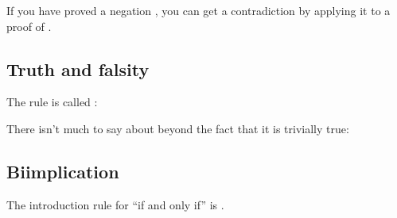 \documentclass[letterpaper,10pt,english]{sphinxmanual}
\begin{document}
\sphinxAtStartPar
If you have proved a negation , you can get a contradiction by applying it to a proof of .

\begin{sphinxVerbatim}[commandchars=\\\{\}]
       

     
\end{sphinxVerbatim}


\subsection{Truth and falsity}
\label{\detokenize{propositional_logic_in_lean:truth-and-falsity}}
\sphinxAtStartPar
The  rule is called :

\begin{sphinxVerbatim}[commandchars=\\\{\}]
   

     
\end{sphinxVerbatim}

\sphinxAtStartPar
There isn’t much to say about  beyond the fact that it is trivially true:

\begin{sphinxVerbatim}[commandchars=\\\{\}]
    
\end{sphinxVerbatim}


\subsection{Bi\sphinxhyphen{}implication}
\label{\detokenize{propositional_logic_in_lean:bi-implication}}
\sphinxAtStartPar
The introduction rule for “if and only if” is .

\begin{sphinxVerbatim}[commandchars=\\\{\}]
     
      
       
      
       
\end{sphinxVerbatim}
\end{document}

